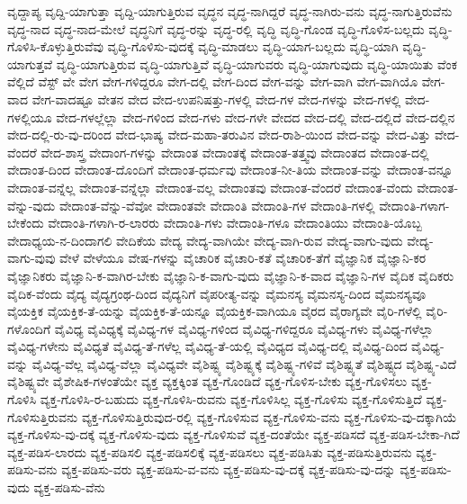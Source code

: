 {ವೃದ್ದಾಪ್ಯ
ವೃದ್ದಿ-ಯಾಗುತ್ತಾ
ವೃದ್ದಿ-ಯಾಗುತ್ತಿರುವ
ವೃದ್ಧನ
ವೃದ್ಧ-ನಾಗಿದ್ದರೆ
ವೃದ್ಧ-ನಾಗಿರು-ವನು
ವೃದ್ಧ-ನಾಗುತ್ತಿರುವೆನು
ವೃದ್ಧ-ನಾದ
ವೃದ್ಧ-ನಾದ-ಮೇಲೆ
ವೃದ್ಧನಿಗೆ
ವೃದ್ಧ-ರನ್ನು
ವೃದ್ಧ-ರಲ್ಲಿ
ವೃದ್ಧಿ
ವೃದ್ಧಿ-ಗೊಂಡ
ವೃದ್ಧಿ-ಗೊಳಿಸ-ಬಲ್ಲದು
ವೃದ್ಧಿ-ಗೊಳಿಸಿ-ಕೊಳ್ಳುತ್ತಿರುವೆವು
ವೃದ್ಧಿ-ಗೊಳಿಸು-ವುದಕ್ಕೆ
ವೃದ್ಧಿ-ಮಾಡಲು
ವೃದ್ಧಿ-ಯಾಗ-ಬಲ್ಲದು
ವೃದ್ಧಿ-ಯಾಗಿ
ವೃದ್ಧಿ-ಯಾಗುತ್ತವೆ
ವೃದ್ಧಿ-ಯಾಗುತ್ತಿರುವ
ವೃದ್ಧಿ-ಯಾಗುತ್ತಿವೆ
ವೃದ್ಧಿ-ಯಾಗುವರು
ವೃದ್ಧಿ-ಯಾಗುವುದು
ವೃದ್ಧಿ-ಯಾಯಿತು
ವೆಂಕ
ವೆಲ್ಲಿದೆ
ವೆಸ್ಟ್
ವೇ
ವೇಗ
ವೇಗ-ಗಳಿದ್ದರೂ
ವೇಗ-ದಲ್ಲಿ
ವೇಗ-ದಿಂದ
ವೇಗ-ವನ್ನು
ವೇಗ-ವಾಗಿ
ವೇಗ-ವಾಗಿಯೊ
ವೇಗ-ವಾದ
ವೇಗ-ವಾದಷ್ಟೂ
ವೇತನ
ವೇದ
ವೇದ-ಉಪನಿಷತ್ತು-ಗಳಲ್ಲಿ
ವೇದ-ಗಳ
ವೇದ-ಗಳನ್ನು
ವೇದ-ಗಳಲ್ಲಿ
ವೇದ-ಗಳಲ್ಲಿಯೂ
ವೇದ-ಗಳಲ್ಲೆಲ್ಲಾ
ವೇದ-ಗಳಿಂದ
ವೇದ-ಗಳು
ವೇದ-ಗಳೇ
ವೇದದ
ವೇದ-ದಲ್ಲಿ
ವೇದ-ದಲ್ಲಿದೆ
ವೇದ-ದಲ್ಲಿನ
ವೇದ-ದಲ್ಲಿ-ರು-ವು-ದರಿಂದ
ವೇದ-ಭಾಷ್ಯ
ವೇದ-ಮಹಾ-ತರುವಿನ
ವೇದ-ರಾಶಿ-ಯಿಂದ
ವೇದ-ವನ್ನು
ವೇದ-ವಿತ್ತು
ವೇದ-ವೆಂದರೆ
ವೇದ-ಶಾಸ್ತ್ರ
ವೇದಾಂಗ-ಗಳನ್ನು
ವೇದಾಂತ
ವೇದಾಂತಕ್ಕೆ
ವೇದಾಂತ-ತತ್ತ್ವವು
ವೇದಾಂತದ
ವೇದಾಂತ-ದಲ್ಲಿ
ವೇದಾಂತ-ದಿಂದ
ವೇದಾಂತ-ದೊಂದಿಗೆ
ವೇದಾಂತ-ಧರ್ಮವು
ವೇದಾಂತ-ನೀ-ತಿಯ
ವೇದಾಂತ-ವನ್ನು
ವೇದಾಂತ-ವನ್ನೂ
ವೇದಾಂತ-ವನ್ನೆಲ್ಲ
ವೇದಾಂತ-ವನ್ನೆಲ್ಲಾ
ವೇದಾಂತ-ವಲ್ಲ
ವೇದಾಂತವು
ವೇದಾಂತ-ವೆಂದರೆ
ವೇದಾಂತ-ವೆಂದು
ವೇದಾಂತ-ವೆನ್ನು-ವುದು
ವೇದಾಂತ-ವೆನ್ನು-ವೆವೋ
ವೇದಾಂತವೇ
ವೇದಾಂತಿ
ವೇದಾಂತಿ-ಗಳ
ವೇದಾಂತಿ-ಗಳಲ್ಲಿ
ವೇದಾಂತಿ-ಗಳಾಗ-ಬೇಕೆಂದು
ವೇದಾಂತಿ-ಗಳಾಗಿ-ರ-ಲಾರರು
ವೇದಾಂತಿ-ಗಳು
ವೇದಾಂತಿ-ಗಳೂ
ವೇದಾಂತಿಯು
ವೇದಾಂತಿ-ಯೊಬ್ಬ
ವೇದಾಧ್ಯಯ-ನ-ದಿಂದಾಗಲಿ
ವೇದಿಕೆಯ
ವೇದ್ಯ
ವೇದ್ಯ-ವಾಗಿಯೇ
ವೇದ್ಯ-ವಾಗಿ-ರುವ
ವೇದ್ಯ-ವಾಗು-ವುದು
ವೇದ್ಯ-ವಾಗು-ವುವು
ವೇಳೆ
ವೇಳೆಯೂ
ವೇಷ-ಗಳನ್ನು
ವೈಚಾರಿಕ
ವೈಚಾರಿ-ಕತೆ
ವೈಚಾರಿಕ-ತೆಗೆ
ವೈಜ್ಞಾನಿಕ
ವೈಜ್ಞಾನಿ-ಕರ
ವೈಜ್ಞಾನಿಕರು
ವೈಜ್ಞಾನಿ-ಕ-ವಾಗಿರ-ಬೇಕು
ವೈಜ್ಞಾನಿ-ಕ-ವಾಗು-ವುದು
ವೈಜ್ಞಾನಿ-ಕ-ವಾದ
ವೈಜ್ಞಾನಿ-ಗಳ
ವೈದಿಕ
ವೈದಿಕರು
ವೈದಿಕ-ವೆಂದು
ವೈದ್ಯ
ವೈದ್ಯಗ್ರಂಥ-ದಿಂದ
ವೈದ್ಯನಿಗೆ
ವೈಪರೀತ್ಯ-ವನ್ನು
ವೈಮನಸ್ಯ
ವೈಮನಸ್ಯ-ದಿಂದ
ವೈಮನಸ್ಯವೂ
ವೈಯಕ್ತಿಕ
ವೈಯಕ್ತಿಕ-ತೆ-ಯನ್ನು
ವೈಯಕ್ತಿಕ-ತೆ-ಯನ್ನೂ
ವೈಯಕ್ತಿಕ-ವಾಗಿಯೂ
ವೈರದ
ವೈರಾಗ್ಯವೇ
ವೈರಿ-ಗಳೆಲ್ಲಿ
ವೈರಿ-ಗಳೊಂದಿಗೆ
ವೈವಿಧ್ಯ
ವೈವಿಧ್ಯಕ್ಕೆ
ವೈವಿಧ್ಯ-ಗಳ
ವೈವಿಧ್ಯ-ಗಳಿಂದ
ವೈವಿಧ್ಯ-ಗಳಿದ್ದರೂ
ವೈವಿಧ್ಯ-ಗಳು
ವೈವಿಧ್ಯ-ಗಳೆಲ್ಲಾ
ವೈವಿಧ್ಯ-ಗಳೇನು
ವೈವಿಧ್ಯತೆ
ವೈವಿಧ್ಯ-ತೆ-ಗಳೆಲ್ಲ
ವೈವಿಧ್ಯ-ತೆ-ಯಲ್ಲಿ
ವೈವಿಧ್ಯದ
ವೈವಿಧ್ಯ-ದಲ್ಲಿ
ವೈವಿಧ್ಯ-ದಿಂದ
ವೈವಿಧ್ಯ-ವನ್ನು
ವೈವಿಧ್ಯ-ವೆಲ್ಲ
ವೈವಿಧ್ಯ-ವೆಲ್ಲಾ
ವೈವಿಧ್ಯವೇ
ವೈಶಿಷ್ಟ್ಯ
ವೈಶಿಷ್ಟ್ಯಕ್ಕೆ
ವೈಶಿಷ್ಟ್ಯ-ಗಳಿವೆ
ವೈಶಿಷ್ಟ್ಯತೆ
ವೈಶಿಷ್ಟ್ಯದ
ವೈಶಿಷ್ಟ್ಯ-ವಿದೆ
ವೈಶಿಷ್ಟ್ಯವೇ
ವೈಶೇಷಿಕ-ಗಳಂತೆಯೇ
ವ್ಯಕ್ತ
ವ್ಯಕ್ತಕ್ಕಿಂತ
ವ್ಯಕ್ತ-ಗೊಂಡಿದೆ
ವ್ಯಕ್ತ-ಗೊಳಿಸ-ಬೇಕು
ವ್ಯಕ್ತ-ಗೊಳಿಸಲು
ವ್ಯಕ್ತ-ಗೊಳಿಸಿ
ವ್ಯಕ್ತ-ಗೊಳಿಸಿ-ರ-ಬಹುದು
ವ್ಯಕ್ತ-ಗೊಳಿಸಿ-ರುವನು
ವ್ಯಕ್ತ-ಗೊಳಿಸಿಲ್ಲ
ವ್ಯಕ್ತ-ಗೊಳಿಸು
ವ್ಯಕ್ತ-ಗೊಳಿಸುತ್ತಿದೆ
ವ್ಯಕ್ತ-ಗೊಳಿಸುತ್ತಿರುವನು
ವ್ಯಕ್ತ-ಗೊಳಿಸುತ್ತಿರುವುದ-ರಲ್ಲಿ
ವ್ಯಕ್ತ-ಗೊಳಿಸುವ
ವ್ಯಕ್ತ-ಗೊಳಿಸು-ವನು
ವ್ಯಕ್ತ-ಗೊಳಿಸು-ವು-ದಕ್ಕಾಗಿಯೆ
ವ್ಯಕ್ತ-ಗೊಳಿಸು-ವು-ದಕ್ಕೆ
ವ್ಯಕ್ತ-ಗೊಳಿಸು-ವುದು
ವ್ಯಕ್ತ-ಗೊಳಿಸುವೆ
ವ್ಯಕ್ತ-ದಂತೆಯೇ
ವ್ಯಕ್ತ-ಪಡಿಸದೆ
ವ್ಯಕ್ತ-ಪಡಿಸ-ಬೇಕಾ-ಗಿದೆ
ವ್ಯಕ್ತ-ಪಡಿಸ-ಲಾರದು
ವ್ಯಕ್ತ-ಪಡಿಸಲಿ
ವ್ಯಕ್ತ-ಪಡಿಸಲಿಕ್ಕೆ
ವ್ಯಕ್ತ-ಪಡಿಸಲು
ವ್ಯಕ್ತ-ಪಡಿಸಿತು
ವ್ಯಕ್ತ-ಪಡಿಸುತ್ತಿರುವನು
ವ್ಯಕ್ತ-ಪಡಿಸು-ವನು
ವ್ಯಕ್ತ-ಪಡಿಸು-ವರು
ವ್ಯಕ್ತ-ಪಡಿಸು-ವ-ವನು
ವ್ಯಕ್ತ-ಪಡಿಸು-ವು-ದಕ್ಕೆ
ವ್ಯಕ್ತ-ಪಡಿಸು-ವು-ದನ್ನು
ವ್ಯಕ್ತ-ಪಡಿಸು-ವುದು
ವ್ಯಕ್ತ-ಪಡಿಸು-ವೆನು
}
